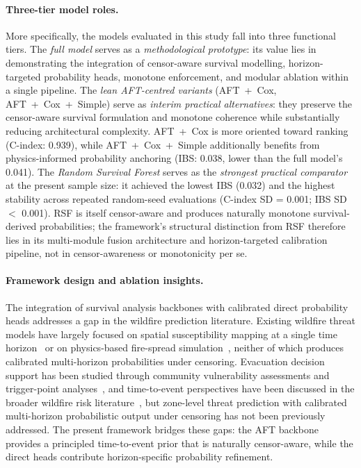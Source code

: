\documentclass[fire,article,submit,pdftex]{../Definitions/mdpi}
\begin{document}
\paragraph{Three-tier model roles.}
More specifically, the models evaluated in this study fall into three functional tiers.
The \emph{full model} serves as a \emph{methodological prototype}: its value lies in demonstrating the integration of censor-aware survival modelling, horizon-targeted probability heads, monotone enforcement, and modular ablation within a single pipeline.
The \emph{lean AFT-centred variants} (AFT~+~Cox, AFT~+~Cox~+~Simple) serve as \emph{interim practical alternatives}: they preserve the censor-aware survival formulation and monotone coherence while substantially reducing architectural complexity.
AFT~+~Cox is more oriented toward ranking (C-index: 0.939), while AFT~+~Cox~+~Simple additionally benefits from physics-informed probability anchoring (IBS: 0.038, lower than the full model's 0.041).
The \emph{Random Survival Forest} serves as the \emph{strongest practical comparator} at the present sample size: it achieved the lowest IBS (0.032) and the highest stability across repeated random-seed evaluations (C-index SD = 0.001; IBS SD $<$ 0.001).
RSF is itself censor-aware and produces naturally monotone survival-derived probabilities; the framework's structural distinction from RSF therefore lies in its multi-module fusion architecture and horizon-targeted calibration pipeline, not in censor-awareness or monotonicity per se.

\paragraph{Framework design and ablation insights.}
The integration of survival analysis backbones with calibrated direct probability heads addresses a gap in the wildfire prediction literature.
Existing wildfire threat models have largely focused on spatial susceptibility mapping at a single time horizon~\cite{Jaafari2019,Gigovic2019,Chen2024wui,Kaur2022} or on physics-based fire-spread simulation~\cite{Finney2001,Cruz2003,Shu2020,Pais2021,Zheng2021}, neither of which produces calibrated multi-horizon probabilities under censoring.
Evacuation decision support has been studied through community vulnerability assessments and trigger-point analyses~\cite{Dolan2022,Paveglio2019,Alcasena2019}, and time-to-event perspectives have been discussed in the broader wildfire risk literature~\cite{Xi2019,Taylor2013}, but zone-level threat prediction with calibrated multi-horizon probabilistic output under censoring has not been previously addressed.
The present framework bridges these gaps: the AFT backbone provides a principled time-to-event prior that is naturally censor-aware, while the direct heads contribute horizon-specific probability refinement.
\end{document}
